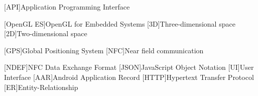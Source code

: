 [API]{Application Programming Interface}

[OpenGL ES]{OpenGL for Embedded Systems}
[3D]{Three-dimensional space}
[2D]{Two-dimensional space}

[GPS]{Global Positioning System}
[NFC]{Near field communication}

[NDEF]{NFC Data Exchange Format}
[JSON]{JavaScript Object Notation}
[UI]{User Interface}
[AAR]{Android Application Record}
[HTTP]{Hypertext Transfer Protocol}
[ER]{Entity-Relationship}